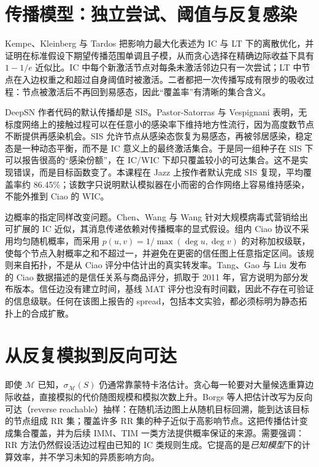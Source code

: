 \documentclass[a4paper,11pt,twocolumn]{ctexart}
\begin{document}
\section{传播模型：独立尝试、阈值与反复感染}

Kempe、Kleinberg 与 Tardos 把影响力最大化表述为 IC 与 LT 下的离散优化，并证明在标准假设下期望传播范围单调且子模，从而贪心选择在精确边际收益下具有 $1-1/e$ 近似比\cite{kempe}。IC 中每个新激活节点对每条未激活邻边只有一次尝试；LT 中节点在入边权重之和超过自身阈值时被激活。二者都把一次传播写成有限步的吸收过程：节点被激活后不再回到易感态，因此“覆盖率”有清晰的集合含义。

DeepSN 作者代码的默认传播却是 SIS。Pastor-Satorras 与 Vespignani 表明，无标度网络上的接触过程可以在任意小的感染率下维持地方性流行，因为高度数节点不断提供再感染机会\cite{pastor}。SIS 允许节点从感染态恢复为易感态，再被邻居感染，稳定态是一种动态平衡，而不是 IC 意义上的最终激活集合。于是同一组种子在 SIS 下可以报告很高的“感染份额”，在 IC/WIC 下却只覆盖较小的可达集合。这不是实现错误，而是目标函数变了。本课程在 Jazz 上按作者默认完成 SIS 复现，平均覆盖率约 86.45\%；该数字只说明默认模拟器在小而密的合作网络上容易维持感染，不能外推到 Ciao 的 WIC。

边概率的指定同样改变问题。Chen、Wang 与 Wang 针对大规模病毒式营销给出可扩展的 IC 近似，其消息传递依赖对传播概率的显式假设\cite{chen2010}。组内 Ciao 协议不采用均匀随机概率，而采用 $p(u,v)=1/\max(\deg u,\deg v)$ 的对称加权级联，使每个节点入射概率之和不超过一，并避免在更密的信任图上任意指定区间。该规则来自拓扑，不是从 Ciao 评分中估计出的真实转发率。Tang、Gao 与 Liu 发布的 Ciao 数据描述的是信任关系与商品评分，抓取于 2011 年，官方说明为部分发布版本\cite{etrust}。信任边没有建立时间，基线 MAT 评分也没有时间戳，因此不存在可验证的信息级联。任何在该图上报告的 spread，包括本文实验，都必须标明为静态拓扑上的合成扩散。

\section{从反复模拟到反向可达}

即使 $\mathcal{M}$ 已知，$\sigma_{\mathcal{M}}(S)$ 仍通常靠蒙特卡洛估计。贪心每一轮要对大量候选重算边际收益，直接模拟的代价随图规模和模拟次数上升。Borgs 等人把估计改写为反向可达（reverse reachable）抽样：在随机活边图上从随机目标回溯，能到达该目标的节点组成 RR 集；覆盖许多 RR 集的种子近似于高影响节点\cite{borgs}。这把传播估计变成集合覆盖，并为后续 IMM、TIM 一类方法提供概率保证的来源。需要强调：RR 方法仍然假设活边过程由已知的 IC 类规则生成。它提高的是\emph{已知模型}下的计算效率，并不学习未知的异质影响方向。
\end{document}
